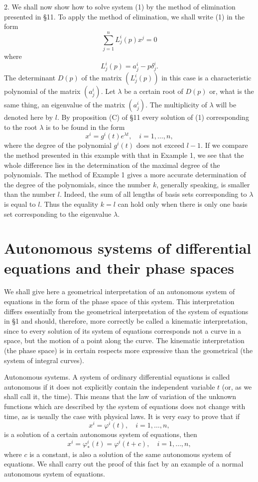 \documentclass[10pt,a5paper]{book}
\theoremstyle{plain}
\theoremstyle{definition}
\theoremstyle{remark}
\begin{document}
2. We shall now show how to solve system (1) by the method of elimination presented in §11. To apply the method of elimination, we shall write (1) in the form
\[
\sum_{j=1}^{n} L_{j}^{i}(p) x^{j}=0
\]
where
\[
L_{j}^{i}(p)=a_{j}^{i}-p \delta_{j}^{i} .
\]
The determinant $D(p)$ of the matrix $\left(L_{j}^{i}(p)\right)$ in this case is a characteristic polynomial of the matrix $\left(a_{j}^{i}\right)$. Let $\lambda$ be a certain root of $D(p)$ or, what is the same thing, an eigenvalue of the matrix $\left(a_{j}^{i}\right)$. The multiplicity of $\lambda$ will be denoted here by $l$. By proposition (C) of §11 every solution of (1) corresponding to the root $\lambda$ is to be found in the form
\[
x^{i}=g^{i}(t) e^{\lambda t}, \quad i=1, \ldots, n,
\]
where the degree of the polynomial $g^{i}(t)$ does not exceed $l-1$. If we compare the method presented in this example with that in Example 1, we see that the whole difference lies in the determination of the maximal degree of the polynomials. The method of Example 1 gives a more accurate determination of the degree of the polynomials, since the number $k$, generally speaking, is smaller than the number $l$. Indeed, the sum of all lengths of basis sets corresponding to $\lambda$ is equal to $l$. Thus the equality $k=l$ can hold only when there is only one basis set corresponding to the eigenvalue $\lambda$.

\section{Autonomous systems of differential equations and their phase spaces}
We shall give here a geometrical interpretation of an autonomous system of equations in the form of the phase space of this system. This interpretation differs essentially from the geometrical interpretation of the system of equations in §1 and should, therefore, more correctly be called a kinematic interpretation, since to every solution of its system of equations corresponds not a curve in a space, but the motion of a point along the curve. The kinematic interpretation (the phase space) is in certain respects more expressive than the geometrical (the system of integral curves).

Autonomous systems. A system of ordinary differential equations is called autonomous if it does not explicitly contain the independent variable $t$ (or, as we shall call it, the time). This means that the law of variation of the unknown functions which are described by the system of equations does not change with time, as is usually the case with physical laws. It is very easy to prove that if
\[
x^{i}=\varphi^{i}(t), \quad i=1, \ldots, n,
\]
is a solution of a certain autonomous system of equations, then
\[
x^{i}=\varphi_{*}^{i}(t)=\varphi^{i}(t+c), \quad i=1, \ldots, n,
\]
where $c$ is a constant, is also a solution of the same autonomous system of equations. We shall carry out the proof of this fact by an example of a normal autonomous system of equations.
\end{document}
